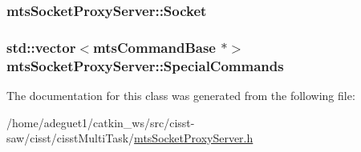 \hypertarget{classmts_socket_proxy_server_a8d1606419800ffe082caf5a6805dde19}{
\subsubsection[{Socket}]{ mts\-Socket\-Proxy\-Server\-::\-Socket\hspace{0.3cm}{\ttfamily [protected]}}}\label{classmts_socket_proxy_server_a8d1606419800ffe082caf5a6805dde19}
\hypertarget{classmts_socket_proxy_server_a033ddf4256700a5393055451d6f883a0}{
\subsubsection[{Special\-Commands}]{\setlength{\rightskip}{0pt plus 5cm}std\-::vector$<${\bf mts\-Command\-Base} $\ast$$>$ mts\-Socket\-Proxy\-Server\-::\-Special\-Commands\hspace{0.3cm}{\ttfamily [protected]}}}\label{classmts_socket_proxy_server_a033ddf4256700a5393055451d6f883a0}


The documentation for this class was generated from the following file\-:\begin{DoxyCompactItemize}
\item 
/home/adeguet1/catkin\-\_\-ws/src/cisst-\/saw/cisst/cisst\-Multi\-Task/\hyperlink{mts_socket_proxy_server_8h}{mts\-Socket\-Proxy\-Server.\-h}\end{DoxyCompactItemize}

